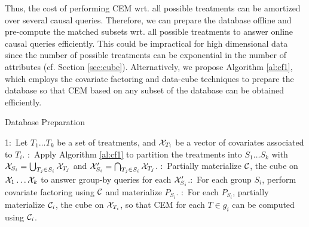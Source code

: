 Thus, the cost of performing CEM wrt. all possible treatments can be amortized over several causal queries. Therefore, we can prepare the database offline and pre-compute the matched subsets wrt. all
possible treatments to answer online causal queries efficiently. This could be impractical for high dimensional data since the number of possible treatments can be exponential in the number of attributes (cf. Section \ref{sec:cube}). Alternatively, we propose
Algorithm \ref{al:cf1}, which employs the covariate factoring and data-cube techniques to prepare the database so that CEM based on
any subset of the database can be obtained efficiently.


\vspace{-0.2cm}
\begin{algorithm} \small
\caption{Database Preparation} \label{alg:dp}
1:\   Let $T_1 \ldots T_k$ be a set of treatments, and  ${{\mathcal{X}}}_{T_i}$ be a vector of covariates associated to $T_i$.   :\ Apply  Algorithm \ref{al:cf1} to partition the treatments into $S_1 \ldots S_k$ with ${{\mathcal{X}}}_{S_i}= \bigcup_{T_j \in S_i} {{\mathcal{X}}}_{T_j}$
and $\mathcal{X}'_{S_i}= \bigcap_{T_j \in S_i} {{\mathcal{X}}}_{T_j} $. :\ Partially materialize $\mathcal{C}$, the cube  on ${{\mathcal{X}}}_1 \ldots {{\mathcal{X}}}_k$ to answer group-by queries for each $\mathcal{X}'_{S_i}$.:\ For each group $S_i$, perform covariate factoring using $\mathcal{C}$ and materialize $P_{S_i}$. :\ For each $P_{S_i}$, partially materialize $\mathcal{C}_i$, the cube on ${{\mathcal{X}}}_{T_i}$, so that CEM for each $T \in g_i$ can be computed using $\mathcal{C}_i$.
\end{algorithm}







